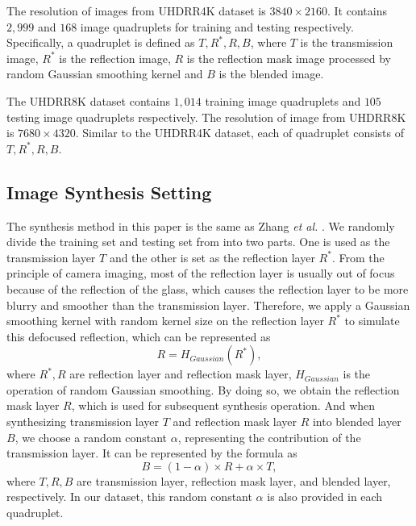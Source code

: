 \documentclass[10pt,journal]{IEEEtran}
\begin{document}
The resolution of images from UHDRR4K dataset is $3840 \times 2160$. 
It contains $2,999$ and $168$ image quadruplets for training and testing respectively. Specifically, a quadruplet is defined as ${T, R^*, R, B}$, where ${T}$ is the transmission image, ${R^*}$ is the reflection image, ${R}$ is the reflection mask image processed by random Gaussian smoothing kernel and ${B}$ is the blended image. 

The UHDRR8K dataset contains $1,014$ training image quadruplets and $105$ testing image quadruplets respectively. The resolution of image from UHDRR8K is $7680 \times 4320$. Similar to the UHDRR4K dataset, each of quadruplet consists of ${T, R^*, R, B}$. 


\subsection{Image Synthesis Setting}
The synthesis method in this paper is the same as Zhang \textit{et al.} \cite{zhangSingleImageReflection2018}. 
We randomly divide the training set and testing set from \cite{zhangBenchmarkingUltraHighDefinitionImage2021} into two parts. One is used as the transmission layer ${T}$ and the other is set as the reflection layer ${R^*}$. 
%
From the principle of camera imaging, most of the reflection layer is usually out of focus because of the reflection of the glass, which causes the reflection layer to be more blurry and smoother than the transmission layer. 
%
Therefore, we apply a Gaussian smoothing kernel with random kernel size on the reflection layer ${R^*}$ to simulate this defocused reflection, which can be represented as 
\begin{equation}
    R = H_{Gaussian} \left ( R^* \right )
    ,\label{Gaussian}
\end{equation}
where ${R^*, R}$ are reflection layer and reflection mask layer, ${H_{Gaussian}}$ is the operation of random Gaussian smoothing.  
%
By doing so, we obtain the reflection mask layer ${R}$, which is used for subsequent synthesis operation. 
And when synthesizing transmission layer ${T}$ and reflection mask layer ${R}$ into blended layer ${B}$, we choose a random constant $\alpha$, representing the contribution of the transmission layer. 
It can be represented by the formula as 
\begin{equation}
	B = \left ( 1-\alpha \right ) \times R + \alpha \times T
	, \label{eq_blend}
\end{equation}
where ${T, R, B}$ are transmission layer, reflection mask layer, and blended layer, respectively. 
%
In our dataset, this random constant $\alpha$ is also provided in each quadruplet. 
\end{document}
